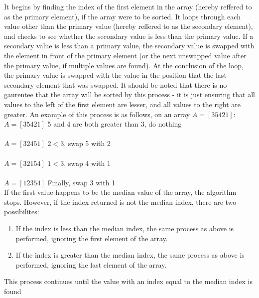 \documentclass{article}
\begin{document}
        It begins by finding the index of the first element in the array (hereby reffered to as the primary element), if the array were to be sorted. It loops through each value other than the primary value (hereby reffered to as the secondary element), and checks to see whether the secondary value is less than the primary value. If a secondary value is less than a primary value, the secondary value is swapped with the element in front of the primary element (or the next unswapped value after the primary value, if multiple values are found). At the conclusion of the loop, the primary value is swapped with the value in the position that the last secondary element that was swapped. It should be noted that there is no gaurentee that the array will be sorted by this process - it is just ensuring that all values to the left of the first element are lesser, and all values to the right are greater. An example of this process is as follows, on an array $A = [3 5 4 2 1]$:\\

        \noindent$A = [3 5 4 2 1]$ 5 and 4 are both greater than 3, do nothing\\\\
        $A = [3 2 4 5 1]$ $2 < 3$, swap 5 with 2\\\\
        $A = [3 2 1 5 4]$ $1 < 3$, swap 4 with 1\\\\
        $A = [1 2 3 5 4]$ Finally, swap 3 with 1\\

        If the first value happens to be the median value of the array, the algorithm stops. However, if the index returned is not the median index, there are two possibilites:

        \begin{enumerate}
            \item If the index is less than the median index, the same process as above is performed, ignoring the first element of the array.
            \item If the index is greater than the median index, the same process as above is performed, ignoring the last element of the array.

        \end{enumerate}

        This process continues until the value with an index equal to the median index is found
\end{document}
